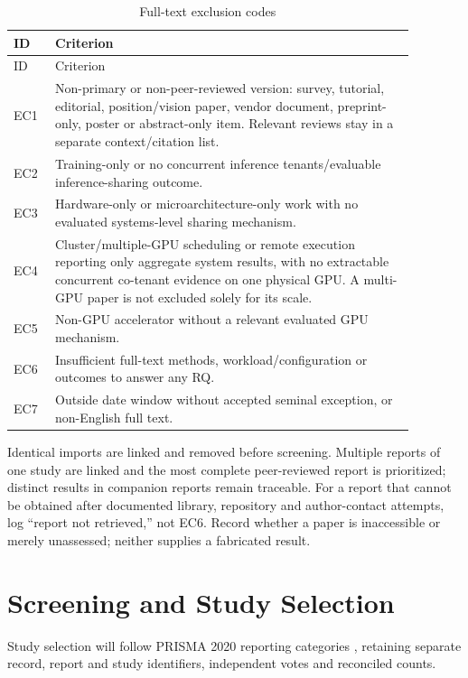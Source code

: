 \documentclass[12pt,a4paper]{article}
\begin{document}
\begin{longtable}{p{0.09\linewidth}p{0.79\linewidth}}
\caption{Full-text exclusion codes}\label{tab:ec}\\\toprule ID & Criterion\\\midrule\endfirsthead
\toprule ID & Criterion\\\midrule\endhead
EC1 & Non-primary or non-peer-reviewed version: survey, tutorial, editorial, position/vision paper, vendor document, preprint-only, poster or abstract-only item. Relevant reviews stay in a separate context/citation list.\\
EC2 & Training-only or no concurrent inference tenants/evaluable inference-sharing outcome.\\
EC3 & Hardware-only or microarchitecture-only work with no evaluated systems-level sharing mechanism.\\
EC4 & Cluster/multiple-GPU scheduling or remote execution reporting only aggregate system results, with no extractable concurrent co-tenant evidence on one physical GPU. A multi-GPU paper is not excluded solely for its scale.\\
EC5 & Non-GPU accelerator without a relevant evaluated GPU mechanism.\\
EC6 & Insufficient full-text methods, workload/configuration or outcomes to answer any RQ.\\
EC7 & Outside date window without accepted seminal exception, or non-English full text.\\\bottomrule
\end{longtable}

Identical imports are linked and removed before screening. Multiple reports of one study are linked and the most complete peer-reviewed report is prioritized; distinct results in companion reports remain traceable. For a report that cannot be obtained after documented library, repository and author-contact attempts, log ``report not retrieved,'' not EC6. Record whether a paper is inaccessible or merely unassessed; neither supplies a fabricated result.

\section{Screening and Study Selection}
Study selection will follow PRISMA 2020 reporting categories \cite{prisma}, retaining separate record, report and study identifiers, independent votes and reconciled counts.
\end{document}
